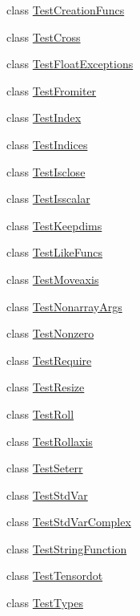 \begin{DoxyCompactItemize}
class \hyperlink{classnumpy_1_1core_1_1tests_1_1test__numeric_1_1TestCreationFuncs}{Test\+Creation\+Funcs}
\item 
class \hyperlink{classnumpy_1_1core_1_1tests_1_1test__numeric_1_1TestCross}{Test\+Cross}
\item 
class \hyperlink{classnumpy_1_1core_1_1tests_1_1test__numeric_1_1TestFloatExceptions}{Test\+Float\+Exceptions}
\item 
class \hyperlink{classnumpy_1_1core_1_1tests_1_1test__numeric_1_1TestFromiter}{Test\+Fromiter}
\item 
class \hyperlink{classnumpy_1_1core_1_1tests_1_1test__numeric_1_1TestIndex}{Test\+Index}
\item 
class \hyperlink{classnumpy_1_1core_1_1tests_1_1test__numeric_1_1TestIndices}{Test\+Indices}
\item 
class \hyperlink{classnumpy_1_1core_1_1tests_1_1test__numeric_1_1TestIsclose}{Test\+Isclose}
\item 
class \hyperlink{classnumpy_1_1core_1_1tests_1_1test__numeric_1_1TestIsscalar}{Test\+Isscalar}
\item 
class \hyperlink{classnumpy_1_1core_1_1tests_1_1test__numeric_1_1TestKeepdims}{Test\+Keepdims}
\item 
class \hyperlink{classnumpy_1_1core_1_1tests_1_1test__numeric_1_1TestLikeFuncs}{Test\+Like\+Funcs}
\item 
class \hyperlink{classnumpy_1_1core_1_1tests_1_1test__numeric_1_1TestMoveaxis}{Test\+Moveaxis}
\item 
class \hyperlink{classnumpy_1_1core_1_1tests_1_1test__numeric_1_1TestNonarrayArgs}{Test\+Nonarray\+Args}
\item 
class \hyperlink{classnumpy_1_1core_1_1tests_1_1test__numeric_1_1TestNonzero}{Test\+Nonzero}
\item 
class \hyperlink{classnumpy_1_1core_1_1tests_1_1test__numeric_1_1TestRequire}{Test\+Require}
\item 
class \hyperlink{classnumpy_1_1core_1_1tests_1_1test__numeric_1_1TestResize}{Test\+Resize}
\item 
class \hyperlink{classnumpy_1_1core_1_1tests_1_1test__numeric_1_1TestRoll}{Test\+Roll}
\item 
class \hyperlink{classnumpy_1_1core_1_1tests_1_1test__numeric_1_1TestRollaxis}{Test\+Rollaxis}
\item 
class \hyperlink{classnumpy_1_1core_1_1tests_1_1test__numeric_1_1TestSeterr}{Test\+Seterr}
\item 
class \hyperlink{classnumpy_1_1core_1_1tests_1_1test__numeric_1_1TestStdVar}{Test\+Std\+Var}
\item 
class \hyperlink{classnumpy_1_1core_1_1tests_1_1test__numeric_1_1TestStdVarComplex}{Test\+Std\+Var\+Complex}
\item 
class \hyperlink{classnumpy_1_1core_1_1tests_1_1test__numeric_1_1TestStringFunction}{Test\+String\+Function}
\item 
class \hyperlink{classnumpy_1_1core_1_1tests_1_1test__numeric_1_1TestTensordot}{Test\+Tensordot}
\item 
class \hyperlink{classnumpy_1_1core_1_1tests_1_1test__numeric_1_1TestTypes}{Test\+Types}
\end{DoxyCompactItemize}
